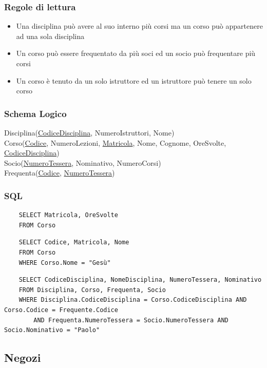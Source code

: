 \documentclass{article}
\begin{document}
	\subsubsection{Regole di lettura}
	\begin{itemize}
		\item Una disciplina può avere al suo interno più corsi ma un corso può appartenere ad una sola disciplina
		\item Un corso può essere frequentato da più soci ed un socio può frequentare più corsi
		\item Un corso è tenuto da un solo istruttore ed un istruttore può tenere un solo corso
	\end{itemize}
	\subsubsection{Schema Logico}
	Disciplina(\underline{CodiceDisciplina}, NumeroIstruttori, Nome)\\
	Corso(\underline{Codice}, NumeroLezioni, \underline{Matricola}, Nome, Cognome, OreSvolte, \underline{CodiceDisciplina})\\
	Socio(\underline{NumeroTessera}, Nominativo, NumeroCorsi)\\
	Frequenta(\underline{Codice}, \underline{NumeroTessera})
	\subsubsection{SQL}
	\begin{verbatim}
	SELECT Matricola, OreSvolte
	FROM Corso
	\end{verbatim}
	\begin{verbatim}
	SELECT Codice, Matricola, Nome
	FROM Corso
	WHERE Corso.Nome = "Gesù"
	\end{verbatim}
	\begin{verbatim}
	SELECT CodiceDisciplina, NomeDisciplina, NumeroTessera, Nominativo
	FROM Disciplina, Corso, Frequenta, Socio
	WHERE Disciplina.CodiceDisciplina = Corso.CodiceDisciplina AND Corso.Codice = Frequente.Codice
		AND Frequenta.NumeroTessera = Socio.NumeroTessera AND Socio.Nominativo = "Paolo"
	\end{verbatim}

	\pagebreak
	
	\subsection{Negozi}
\end{document}
